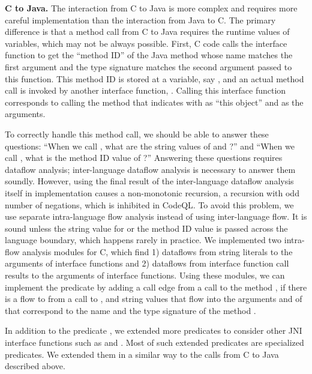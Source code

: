\textbf{C to Java.} The interaction from C to Java is more complex and
requires more careful implementation than the interaction from Java to C.
The primary difference is that a method call from C to Java requires
the runtime values of variables, which may not be always possible.
First, C code calls the interface function 
to get the ``method ID'' of the Java method whose name matches the first argument
and the type signature matches the second argument passed to this function.
This method ID is stored at a variable, say , and
an actual method call is invoked by another
interface function, . Calling this interface 
function corresponds to calling the method that  indicates
with  as ``this object'' and  as the arguments.

To correctly handle this method call, we should be able to answer these
questions: ``When we call ,
what are the string values of  and ?'' and
``When we call , what is the method ID value of ?''
Answering these questions requires dataflow analysis;
inter-language dataflow analysis is necessary to answer them soundly.
However, using the final result of the inter-language dataflow analysis itself
in implementation causes a non-monotonic recursion, a recursion with odd number of
negations, which is inhibited in CodeQL.
To avoid this problem, we use separate intra-language flow analysis  instead of
using inter-language flow. It is sound unless the string
value for or the method ID value is passed across the language boundary, which happens
rarely in practice.
We implemented two intra-flow analysis modules for C,
which find 1) dataflows from string literals to the arguments of interface functions
and 2) dataflows from interface function call results to the arguments of interface functions.
Using these modules, we can implement the
predicate  by adding a call edge from a 
call to the method , if there is a flow to  from a
call to , and string values that flow into the
arguments  and  of  that
correspond to the name and the type signature of the method .

In addition to the predicate ,
we extended more predicates to consider other JNI interface functions such as
 and .
Most of such extended predicates are specialized  predicates.
We extended them in a similar way to the calls from C to Java described above.

